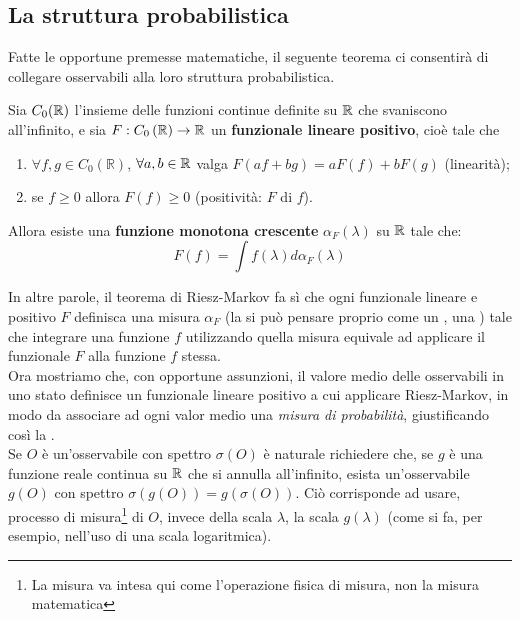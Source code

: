 \documentclass[FisicaTeorica.tex]{subfiles}
\begin{document}
\subsection{La struttura probabilistica}
Fatte le opportune premesse matematiche, il seguente teorema ci consentirà di collegare osservabili alla loro struttura probabilistica.
\begin{thm}
\label{thm:riesz-markov}
Sia $C_0(\mathbb{R})$ l'insieme delle funzioni continue definite su $\mathbb{R}$ che svaniscono all'infinito, e sia $F:C_0\left(\mathbb{R}\right)\to \mathbb{R}$  un \textbf{funzionale lineare positivo}, cioè tale che
\begin{enumerate}
\item $\forall f,g\in C_0\left(\mathbb{R}\right)$, $\forall a,b\in \mathbb{R}$ valga $F\left(af+bg\right)=aF\left(f\right)+bF(g)$ (linearità);
\item se $f\geq 0$ allora $F\left(f\right)\geq 0$ (positività: $F$  di $f$).\\
\end{enumerate}
Allora esiste una \textbf{funzione monotona crescente} $\alpha_F\left(\lambda\right)$ su $\mathbb{R}$ tale che: 
\[
F\left(f\right)=\int f\left(\lambda\right)d\alpha_F\left(\lambda\right)
\]
\end{thm}
In altre parole, il teorema di Riesz-Markov fa sì che ogni funzionale lineare e positivo $F$ definisca una misura $\alpha_F$ (la si può pensare proprio come un , una ) tale che integrare una funzione $f$ utilizzando quella misura equivale ad applicare il funzionale $F$ alla funzione $f$ stessa.\\
Ora mostriamo che, con opportune assunzioni, il valore medio delle osservabili in uno stato definisce un funzionale lineare positivo a cui applicare Riesz-Markov, in modo da associare ad ogni valor medio una \emph{misura di probabilità}, giustificando così la .\\
Se $O$ è un'osservabile con spettro $\sigma \left(O\right)$ è naturale richiedere che, se $g$ è una funzione reale continua su $\mathbb{R}$ che si annulla all'infinito, esista un'osservabile $g(O)$ con spettro $\sigma \left(g\left(O\right)\right)=g\left(\sigma\left(O\right)\right)$. Ciò corrisponde ad usare,  processo di misura\footnote{La misura va intesa qui come l'operazione fisica di misura, non la misura matematica} di $O$, invece della scala $\lambda$, la scala $g\left(\lambda\right)$ (come si fa, per esempio, nell'uso di una scala logaritmica).\\
\end{document}
